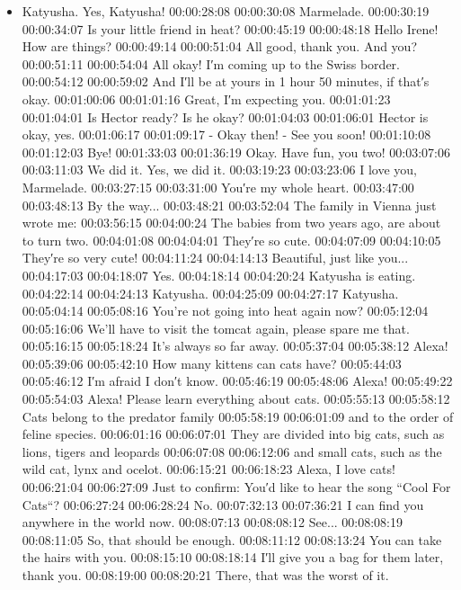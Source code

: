 \begin{itemize}
\tightlist
\item
  Katyusha. Yes, Katyusha! 00:00:28:08 00:00:30:08 Marmelade.
  00:00:30:19 00:00:34:07 Is your little friend in heat? 00:00:45:19
  00:00:48:18 Hello Irene! How are things? 00:00:49:14 00:00:51:04 All
  good, thank you. And you? 00:00:51:11 00:00:54:04 All okay! I′m coming
  up to the Swiss border. 00:00:54:12 00:00:59:02 And I′ll be at yours
  in 1 hour 50 minutes, if that′s okay. 00:01:00:06 00:01:01:16 Great,
  I′m expecting you. 00:01:01:23 00:01:04:01 Is Hector ready? Is he
  okay? 00:01:04:03 00:01:06:01 Hector is okay, yes. 00:01:06:17
  00:01:09:17 - Okay then! - See you soon! 00:01:10:08 00:01:12:03 Bye!
  00:01:33:03 00:01:36:19 Okay. Have fun, you two! 00:03:07:06
  00:03:11:03 We did it. Yes, we did it. 00:03:19:23 00:03:23:06 I love
  you, Marmelade. 00:03:27:15 00:03:31:00 You′re my whole heart.
  00:03:47:00 00:03:48:13 By the way... 00:03:48:21 00:03:52:04 The
  family in Vienna just wrote me: 00:03:56:15 00:04:00:24 The babies
  from two years ago, are about to turn two. 00:04:01:08 00:04:04:01
  They′re so cute. 00:04:07:09 00:04:10:05 They′re so very cute!
  00:04:11:24 00:04:14:13 Beautiful, just like you... 00:04:17:03
  00:04:18:07 Yes. 00:04:18:14 00:04:20:24 Katyusha is eating.
  00:04:22:14 00:04:24:13 Katyusha. 00:04:25:09 00:04:27:17 Katyusha.
  00:05:04:14 00:05:08:16 You're not going into heat again now?
  00:05:12:04 00:05:16:06 We'll have to visit the tomcat again, please
  spare me that. 00:05:16:15 00:05:18:24 It's always so far away.
  00:05:37:04 00:05:38:12 Alexa! 00:05:39:06 00:05:42:10 How many
  kittens can cats have? 00:05:44:03 00:05:46:12 I′m afraid I don′t
  know. 00:05:46:19 00:05:48:06 Alexa! 00:05:49:22 00:05:54:03 Alexa!
  Please learn everything about cats. 00:05:55:13 00:05:58:12 Cats
  belong to the predator family 00:05:58:19 00:06:01:09 and to the order
  of feline species. 00:06:01:16 00:06:07:01 They are divided into big
  cats, such as lions, tigers and leopards 00:06:07:08 00:06:12:06 and
  small cats, such as the wild cat, lynx and ocelot. 00:06:15:21
  00:06:18:23 Alexa, I love cats! 00:06:21:04 00:06:27:09 Just to
  confirm: You′d like to hear the song ``Cool For Cats``? 00:06:27:24
  00:06:28:24 No. 00:07:32:13 00:07:36:21 I can find you anywhere in the
  world now. 00:08:07:13 00:08:08:12 See... 00:08:08:19 00:08:11:05 So,
  that should be enough. 00:08:11:12 00:08:13:24 You can take the hairs
  with you. 00:08:15:10 00:08:18:14 I′ll give you a bag for them later,
  thank you. 00:08:19:00 00:08:20:21 There, that was the worst of it.

\end{itemize}
